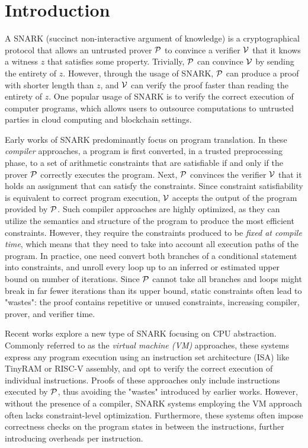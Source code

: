 \section{Introduction}

A SNARK (succinct non-interactive argument of knowledge) is a cryptographical protocol that allows an untrusted prover $\P$ to convince a verifier $\V$ that it knows a witness $z$ that satisfies some property. Trivially, $\P$ can convince $\V$ by sending the entirety of $z$. However, through the usage of SNARK, $\P$ can produce a proof with shorter length than $z$, and $\V$ can verify the proof faster than reading the entirety of $z$. One popular usage of SNARK is to verify the correct execution of computer programs, which allows users to outsource computations to untrusted parties in cloud computing and blockchain settings.

Early works \cite{setty12ginger, wahby14buffet, kosba18xjsnark, ozdemir20circ} of SNARK predominantly focus on program translation. In these \emph{compiler} approaches, a program is first converted, in a trusted preprocessing phase, to a set of arithmetic constraints that are satisfiable if and only if the prover $\P$ correctly executes the program. Next, $\P$ convinces the verifier $\V$ that it holds an assignment that can satisfy the constraints. Since constraint satisfiability is equivalent to correct program execution, $\V$ accepts the output of the program provided by $\P$. Such compiler approaches are highly optimized, as they can utilize the semantics and structure of the program to produce the most efficient constraints. However, they require the constraints produced to be \emph{fixed at compile time}, which means that they need to take into account all execution paths of the program. In practice, one need convert both branches of a conditional statement into constraints, and unroll every loop up to an inferred or estimated upper bound on number of iterations. Since $\P$ cannot take all branches and loops might break in far fewer iterations than its upper bound, static constraints often lead to "wastes": the proof contains repetitive or unused constraints, increasing compiler, prover, and verifier time.

Recent works \cite{zhang18vram, arun23jolt} explore a new type of SNARK focusing on CPU abstraction. Commonly referred to as the \emph{virtual machine (VM)} approaches, these systems express any program execution using an instruction set architecture (ISA) like TinyRAM or RISC-V assembly, and opt to verify the correct execution of individual instructions. Proofs of these approaches only include instructions executed by $\P$, thus avoiding the "wastes" introduced by earlier works. However, without the presence of a compiler, SNARK systems employing the VM approach often lacks constraint-level optimization. Furthermore, these systems often impose correctness checks on the program states in between the instructions, further introducing overheads per instruction.

